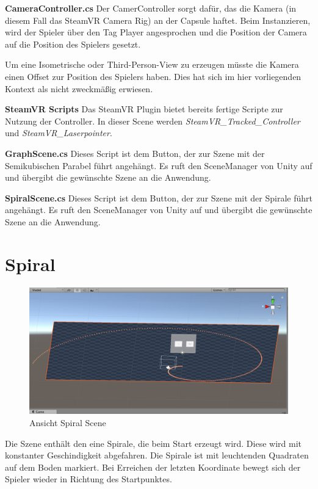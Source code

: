\textbf{CameraController.cs}
Der CamerController sorgt dafür, das die Kamera (in diesem Fall das SteamVR Camera Rig) an der Capsule haftet. Beim Instanzieren, wird der Spieler über den Tag \glqq Player\grqq{} angesprochen und die Position der Camera auf die Position des Spielers gesetzt. 

Um eine Isometrische oder Third-Person-View zu erzeugen müsste die Kamera einen Offset zur Position des Spielers haben. Dies hat sich im hier vorliegenden Kontext als nicht zweckmäßig erwiesen. 

\textbf{SteamVR Scripts}
Das SteamVR Plugin bietet bereits fertige Scripte zur Nutzung der Controller. In dieser Scene werden \emph{SteamVR\_Tracked\_Controller} und \emph{SteamVR\_Laserpointer}. 


\textbf{GraphScene.cs}
Dieses Script ist dem Button, der zur Szene mit der Semikubischen Parabel führt angehängt. Es ruft den SceneManager von Unity auf und übergibt die gewünschte Szene an die Anwendung.

\textbf{SpiralScene.cs}
Dieses Script ist dem Button, der zur Szene mit der Spirale führt angehängt. Es ruft den SceneManager von Unity auf und übergibt die gewünschte Szene an die Anwendung.

\section{Spiral}
\label{Spirale}

\begin{figure}[h!]
	\includegraphics[scale=0.5]{bilder/spiralScene.png}
	\caption{Ansicht Spiral Scene}
\end{figure}


Die Szene enthält den eine Spirale, die beim Start erzeugt wird. Diese wird mit konstanter Geschindigkeit abgefahren. Die Spirale ist mit leuchtenden Quadraten auf dem Boden markiert. Bei Erreichen der letzten Koordinate bewegt sich der Spieler wieder in Richtung des Startpunktes. 


